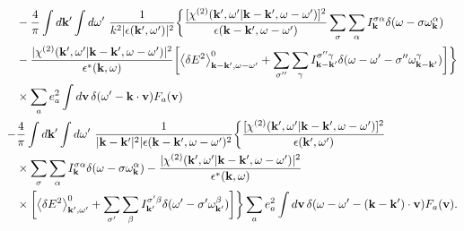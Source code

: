 \documentclass[10pt,aspectratio=1610,lualatex]{beamer}
\begin{document}
\begin{frame}[noframenumbering]
   \begin{displaymath}
     \begin{split}
&-\frac{4}{\pi}\int d{\bf k '} \int d\omega '\
\frac{1}{k^2|\epsilon({\bf k'},\omega ')|^2}
\biggl\{ \frac{[\chi^{(2)}({\bf k'},\omega '|{\bf k-k'},\omega-\omega ')]^2}
{\epsilon({\bf k - k'},\omega-\omega ')}\sum_{\sigma}\sum_{\alpha}
   I_{\bf k}^{\sigma \alpha}\delta(\omega-\sigma \omega_{\bf k}^\alpha)\\
  &-\frac{|\chi^{(2)}({\bf k'},\omega '|{\bf k-k'},\omega-\omega ')|^2}
   {\epsilon^*({\bf k},\omega)}
     \biggl[ \left< \delta E^2 \right>_{{\bf k - k'},\omega-\omega '}^0
     +\sum_{\sigma ''}\sum_{\gamma}I_{\bf k -k'}^{\sigma '' \gamma}
     \delta(\omega-\omega ' -\sigma '' \omega_{\bf k -k'}^\gamma)\biggr]\biggr\}\\
     &\times\sum_ae_a^2\int d{\bf v}\,
     \delta(\omega '-{\bf k \cdot v})F_a({\bf v})\\
-&\frac{4}{\pi}\int d{\bf k '} \int d\omega '\
\frac{1}{|{\bf k - k'}|^2|\epsilon({\bf k-k'},\omega-\omega ')^2}
\biggl\{ \frac{[\chi^{(2)}({\bf k'},\omega '|{\bf k-k'},\omega-\omega ')]^2}
   {\epsilon({\bf k'},\omega ')}\\
  &\times\sum_{\sigma}\sum_{\alpha}
  I_{\bf k}^{\sigma \alpha}\delta(\omega-\sigma \omega_{\bf k}^\alpha)
-\frac{|\chi^{(2)}({\bf k'},\omega '|{\bf k-k'},\omega-\omega ')|^2}
{\epsilon^*({\bf k},\omega)}\\
&\times \biggl[\left< \delta E^2 \right>_{{\bf k'},\omega '}^0
   +\sum_{\sigma '}\sum_{\beta}I_{\bf k'}^{\sigma ' \beta}
   \delta(\omega '-\sigma ' \omega_{\bf k'}^\beta)\biggr]\biggr\}
   \sum_a e_a^2\int d{\bf v}\,
   \delta(\omega-\omega '-{\bf (k-k')\cdot v})F_a({\bf v}).
     \end{split}
   \end{displaymath}
 \end{frame}


\end{document}
